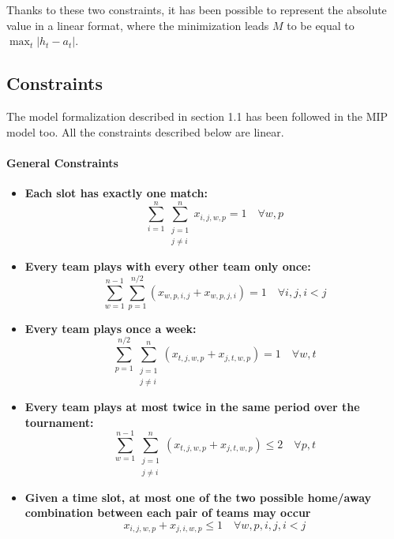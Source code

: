 \documentclass{article}
\begin{document}
Thanks to these two constraints, it has been possible to represent the absolute value in a linear format, where the minimization leads $M$ to be equal to $\max_{t} |h_t - a_t|$.

\subsection{Constraints}

The model formalization described in section 1.1 has been followed in the MIP model too. All the constraints described below are linear.

\paragraph{General Constraints}

\begin{itemize}
    \item \textbf{Each slot has exactly one match:}
    \begin{equation}
        \sum_{i=1}^{n} \sum_{\substack{j=1 \\ j \neq i}}^{n} x_{i,j,w,p} = 1 \quad \forall w, p
    \end{equation}

    \item \textbf{Every team plays with every other team only once:}
    \begin{equation}
        \sum_{w=1}^{n-1} \sum_{p=1}^{n/2} (x_{w,p,i,j} + x_{w,p,j,i})  = 1 \quad \forall i,j, i < j
    \end{equation}

    \item \textbf{Every team plays once a week:}
    \begin{equation}
        \sum_{p=1}^{n/2} \sum_{\substack{j=1 \\ j \neq i}}^{n} (x_{t,j,w,p} + x_{j,t,w,p}) = 1 \quad \forall w, t
    \end{equation}

    \item \textbf{Every team plays at most twice in the same period over the tournament:}
    \begin{equation}
        \sum_{w=1}^{n-1} \sum_{\substack{j=1 \\ j \neq i}}^{n} (x_{t,j,w,p} + x_{j,t,w,p}) \leq 2 \quad \forall p, t
    \end{equation}

    \item \textbf{Given a time slot, at most one of the two possible home/away combination between each pair of teams may occur}
    \begin{equation}
        x_{i,j,w,p} + x_{j,i,w,p} \leq 1 \quad \forall w, p, i, j, i < j
    \end{equation}
\end{itemize}
\end{document}

